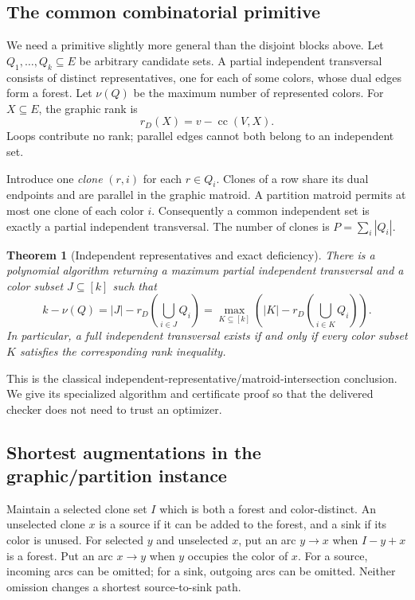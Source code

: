 \documentclass[11pt,letterpaper]{article}
\newtheorem{theorem}{Theorem}[section]
\theoremstyle{definition}
\theoremstyle{remark}
\DeclareMathOperator{\cc}{cc}
\begin{document}
\subsection{The common combinatorial primitive}
We need a primitive slightly more general than the disjoint blocks above.
Let $Q_1,\ldots,Q_k\subseteq E$ be arbitrary candidate sets. A partial independent
transversal consists of distinct representatives, one for each of some colors,
whose dual edges form a forest. Let $\nu(Q)$ be the maximum number of represented
colors. For $X\subseteq E$, the graphic rank is
\begin{equation}\label{eq:graphic-rank}
 r_D(X)=v-\cc(V,X).
\end{equation}
Loops contribute no rank; parallel edges cannot both belong to an independent set.

Introduce one \emph{clone} $(r,i)$ for each $r\in Q_i$. Clones of a row share its
dual endpoints and are parallel in the graphic matroid. A partition matroid
permits at most one clone of each color $i$. Consequently a common independent
set is exactly a partial independent transversal. The number of clones is
$P=\sum_i|Q_i|$.

\begin{theorem}[Independent representatives and exact deficiency]\label{thm:rado}
There is a polynomial algorithm returning a maximum partial independent
transversal and a color subset $J\subseteq[k]$ such that
\begin{equation}\label{eq:rado-deficiency}
 k-\nu(Q)=|J|-r_D\!\left(\bigcup_{i\in J}Q_i\right)
 =\max_{K\subseteq[k]}\left(|K|-r_D\!\left(\bigcup_{i\in K}Q_i\right)\right).
\end{equation}
In particular, a full independent transversal exists if and only if every color
subset $K$ satisfies the corresponding rank inequality.
\end{theorem}
This is the classical independent-representative/matroid-intersection conclusion.
We give its specialized algorithm and certificate proof so that the delivered
checker does not need to trust an optimizer.

\subsection{Shortest augmentations in the graphic/partition instance}
Maintain a selected clone set $I$ which is both a forest and color-distinct. An
unselected clone $x$ is a source if it can be added to the forest, and a sink if
its color is unused. For selected $y$ and unselected $x$, put an arc $y\to x$
when $I-y+x$ is a forest. Put an arc $x\to y$ when $y$ occupies the color of $x$.
For a source, incoming arcs can be omitted; for a sink, outgoing arcs can be
omitted. Neither omission changes a shortest source-to-sink path.
\end{document}
